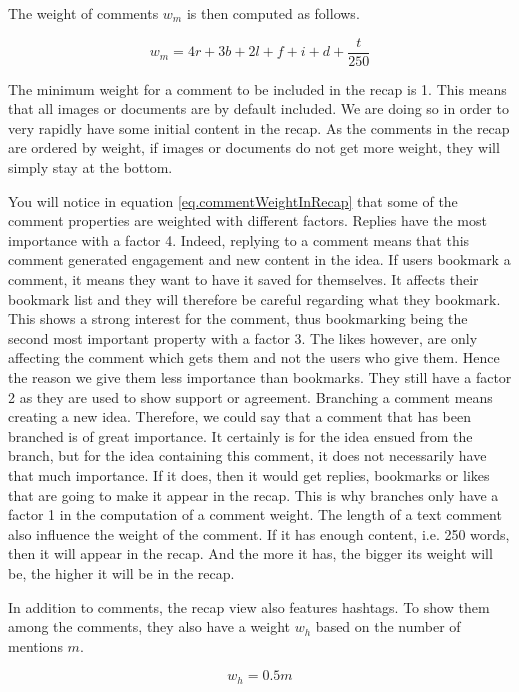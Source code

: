 \documentclass[a4paper,12pt,twoside]{article}
\begin{document}
The weight of comments $w_m$ is then computed as follows.

\begin{equation}
    \label{eq.commentWeightInRecap}
    w_m = 4r + 3b + 2l + f + i + d + \frac{t}{250}
\end{equation}

The minimum weight for a comment to be included in the recap is 1.
This means that all images or documents are by default included.
We are doing so in order to very rapidly have some initial content in the recap.
As the comments in the recap are ordered by weight, if images or documents do not get more weight, they will simply stay at the bottom.

You will notice in equation \ref{eq.commentWeightInRecap} that some of the comment properties are weighted with different factors.
Replies have the most importance with a factor 4.
Indeed, replying to a comment means that this comment generated engagement and new content in the idea.
If users bookmark a comment, it means they want to have it saved for themselves.
It affects their bookmark list and they will therefore be careful regarding what they bookmark.
This shows a strong interest for the comment, thus bookmarking being the second most important property with a factor 3.
The likes however, are only affecting the comment which gets them and not the users who give them.
Hence the reason we give them less importance than bookmarks.
They still have a factor 2 as they are used to show support or agreement.
Branching a comment means creating a new idea.
Therefore, we could say that a comment that has been branched is of great importance.
It certainly is for the idea ensued from the branch, but for the idea containing this comment, it does not necessarily have that much importance.
If it does, then it would get replies, bookmarks or likes that are going to make it appear in the recap.
This is why branches only have a factor 1 in the computation of a comment weight.
The length of a text comment also influence the weight of the comment.
If it has enough content, i.e. 250 words, then it will appear in the recap.
And the more it has, the bigger its weight will be, the higher it will be in the recap.

In addition to comments, the recap view also features hashtags.
To show them among the comments, they also have a weight $w_h$ based on the number of mentions $m$.

\begin{equation}
    \label{eq.hashtagWeightInRecap}
    w_h = 0.5m
\end{equation}
\end{document}
